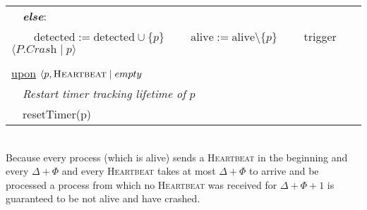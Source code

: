 \documentclass{article}
\begin{document}
\begin{adjustwidth}{2em}{2em}
\begin{center}
\begin{tabular}{|l|}
				\ \ \textit{\textbf{else}}: \\
				\ \ \ \ $\text{detected} := \text{detected} \cup \{p\}$
        		\ \ \ \ $\text{alive} := \text{alive} \setminus \{p\}$
				\ \ \ \ trigger $\langle P.\textit{Crash} \mid p \rangle$ \\
				\\
				\underline{upon} $\langle p, \textsc{Heartbeat} \mid empty$ \\
				\ \ \textit{Restart timer tracking lifetime of} $p$ \\
				\ \ resetTimer(p) \\ 
				\hline
			\end{tabular}
		\end{center}
		\hfill \\
		Because every process (which is alive) sends a \textsc{Heartbeat} in the beginning and every $\Delta + \Phi$ and every \textsc{Heartbeat} takes at most $\Delta + \Phi$ to arrive and be processed a process from which no \textsc{Heartbeat} was received for $\Delta + \Phi + 1$ is guaranteed to be not alive and have crashed.
	\end{adjustwidth}
\end{document}
